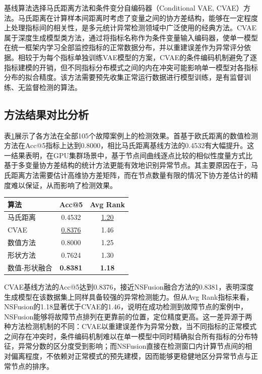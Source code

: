基线算法选择马氏距离方法和条件变分自编码器（Conditional VAE, CVAE）\cite{sohn2015cvae}方法。马氏距离在计算样本间距离时考虑了变量之间的协方差结构，能够在一定程度上处理指标间的相关性，是多元统计异常检测领域中广泛使用的经典方法。CVAE属于深度生成模型类方法，通过将指标名称作为条件变量输入编码器，使单一模型在统一框架内学习全部监控指标的正常数据分布，并以重建误差作为异常评分依据。相较于为每个指标单独训练VAE模型的方案，CVAE的条件编码机制避免了逐指标建模的开销，但不同指标分布模式之间的内在冲突可能影响单一模型对各指标分布的拟合精度。该方法需要预先收集正常运行数据进行模型训练，是有监督训练、无监督检测的算法。

\subsection{方法结果对比分析}

表\ref{tab:multi_metric_results}展示了各方法在全部105个故障案例上的检测效果。首基于欧氏距离的数值检测方法在Acc@5指标上达到0.8000，相比马氏距离基线方法的0.4532有大幅提升。这一结果表明，在GPU集群场景中，基于节点间曲线逐点比较的相似性度量方式比基于多变量协方差结构的统计方法更能有效地识别异常节点。其主要原因在于，马氏距离方法需要估计高维协方差矩阵，而在节点数量有限的情况下协方差估计的精度难以保证，从而影响了检测效果。

\begin{table}[htbp]
    \centering
    \label{tab:multi_metric_results}
    \begin{tabular}{lcc}
        \toprule
        算法 & Acc@5 & Avg Rank \\
        \midrule
        马氏距离 & 0.4532 & \underline{1.20} \\
        CVAE & \underline{0.8376} & 1.46 \\
        数值方法 & 0.8000 & 1.25 \\
        形状方法 & 0.7624 & 1.30 \\
        数值-形状融合 & \textbf{0.8381} & \textbf{1.18} \\
        \bottomrule
    \end{tabular}
\end{table}

CVAE基线方法的Acc@5达到0.8376，接近NSFusion融合方法的0.8381，表明深度生成模型在该数据集上同样具备较强的异常检测能力。但从Avg Rank指标来看，NSFusion的1.18显著优于CVAE的1.46，说明在成功检测到故障节点的案例中，NSFusion能够将故障节点排列在更靠前的位置，定位精度更高。这一差异源于两种方法检测机制的不同：CVAE以重建误差作为异常分数，当不同指标的正常模式之间存在冲突时，条件编码机制难以在单一模型中同时精确拟合所有指标的分布特征，异常分数的区分度受到影响；而NSFusion直接在检测窗口内计算节点间的相对偏离程度，不依赖对正常模式的预先建模，因而能够更稳健地区分异常节点与正常节点的排序。

